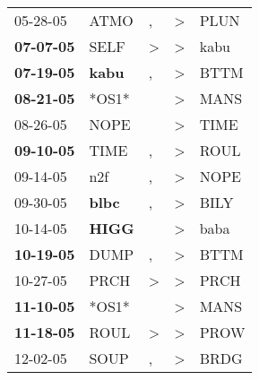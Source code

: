 \begin{supertabular}{p{0.07\textwidth}p{0.06\textwidth}p{0.02\textwidth}p{0.02\textwidth}p{0.06\textwidth}}
          05-28-05\textsuperscript{} &           ATMO\textsuperscript{} &                , &     \textgreater &           PLUN\textsuperscript{} \\
 \textbf{07-07-05\textsuperscript{}} &           SELF\textsuperscript{} &     \textgreater &     \textgreater &           kabu\textsuperscript{} \\
 \textbf{07-19-05\textsuperscript{}} &  \textbf{kabu\textsuperscript{}} &                , &     \textgreater &           BTTM\textsuperscript{} \\
 \textbf{08-21-05\textsuperscript{}} &                            *OS1* &                  &     \textgreater &           MANS\textsuperscript{} \\
          08-26-05\textsuperscript{} &           NOPE\textsuperscript{} &                  &     \textgreater &           TIME\textsuperscript{} \\
 \textbf{09-10-05\textsuperscript{}} &           TIME\textsuperscript{} &                , &     \textgreater &           ROUL\textsuperscript{} \\
          09-14-05\textsuperscript{} &            n2f\textsuperscript{} &                , &     \textgreater &           NOPE\textsuperscript{} \\
          09-30-05\textsuperscript{} &  \textbf{blbc\textsuperscript{}} &                , &     \textgreater &           BILY\textsuperscript{} \\
          10-14-05\textsuperscript{} &  \textbf{HIGG\textsuperscript{}} &                  &     \textgreater &           baba\textsuperscript{} \\
 \textbf{10-19-05\textsuperscript{}} &           DUMP\textsuperscript{} &                , &     \textgreater &           BTTM\textsuperscript{} \\
          10-27-05\textsuperscript{} &           PRCH\textsuperscript{} &     \textgreater &     \textgreater &           PRCH\textsuperscript{} \\
 \textbf{11-10-05\textsuperscript{}} &                            *OS1* &                  &     \textgreater &           MANS\textsuperscript{} \\
 \textbf{11-18-05\textsuperscript{}} &           ROUL\textsuperscript{} &     \textgreater &     \textgreater &           PROW\textsuperscript{} \\
          12-02-05\textsuperscript{} &           SOUP\textsuperscript{} &                , &     \textgreater &           BRDG\textsuperscript{} \\

\end{supertabular}
